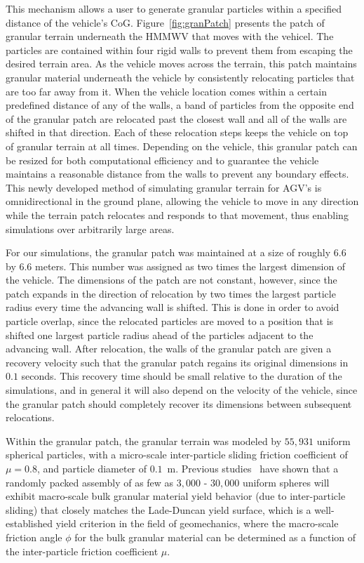 \documentclass[12pt,onecolumn]{article}
\newcommand{\CHRONO}{{\sffamily{{Chrono}}}}
\begin{document}
This mechanism allows a user to generate granular particles within a specified distance of the vehicle's CoG. Figure~\ref{fig:granPatch} presents the patch of granular terrain underneath the {\CHRONO}  HMMWV that moves with the vehicel. The particles are contained within four rigid walls to prevent them from escaping the desired terrain area. As the vehicle moves across the terrain, this patch maintains granular material underneath the vehicle by consistently relocating particles that are too far away from it. When the vehicle location comes within a certain predefined distance of any of the walls, a band of particles from the opposite end of the granular patch are relocated past the closest wall and all of the walls are shifted in that direction. Each of these relocation steps keeps the vehicle on top of granular terrain at all times. Depending on the vehicle, this granular patch can be resized for both computational efficiency and to guarantee the vehicle maintains a reasonable distance from the walls to prevent any boundary effects. This newly developed method of simulating granular terrain for AGV's is omnidirectional in the ground plane, allowing the vehicle to move in any direction while the terrain patch relocates and responds to that movement, thus enabling simulations over arbitrarily large areas.

For our simulations, the granular patch was maintained at a size of roughly $6.6$ by $6.6$ meters.  This number was assigned as two times the largest dimension of the vehicle.  The dimensions of the patch are not constant, however, since the patch expands in the direction of relocation by two times the largest particle radius every time the advancing wall is shifted.  This is done in order to avoid particle overlap, since the relocated particles are moved to a position that is shifted one largest particle radius ahead of the particles adjacent to the advancing wall.  After relocation, the walls of the granular patch are given a recovery velocity such that the granular patch regains its original dimensions in $0.1$ seconds.  This recovery time should be small relative to the duration of the simulations, and in general it will also depend on the velocity of the vehicle, since the granular patch should completely recover its dimensions between subsequent relocations.

Within the granular patch, the granular terrain was modeled by $55,931$ uniform spherical particles, with a micro-scale inter-particle sliding friction coefficient of $\mu = 0.8$, and particle diameter of $0.1$~m.  Previous studies~\cite{fleischmannetalGEGE2014} have shown that 
a randomly packed assembly of as few as $3,000$ - $30,000$ uniform spheres will exhibit macro-scale bulk granular material yield behavior (due to inter-particle sliding) that closely matches the Lade-Duncan yield surface, which is a well-established yield criterion in the field of geomechanics, where the macro-scale friction angle $\phi$ for the bulk granular material can be determined as a function of the inter-particle friction coefficient $\mu$.
\end{document}
